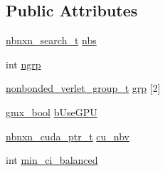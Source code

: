 \subsection*{\-Public \-Attributes}
\begin{DoxyCompactItemize}
\item 
\hyperlink{include_2types_2nbnxn__pairlist_8h_a41ece6776fdeb7f4b5f41800a871897a}{nbnxn\-\_\-search\-\_\-t} \hyperlink{structnonbonded__verlet__t_a94f84c4baa8b982529549b8024c87541}{nbs}
\item 
int \hyperlink{structnonbonded__verlet__t_aedf87f8d2c959c49f09c4f733f93ed7f}{ngrp}
\item 
\hyperlink{structnonbonded__verlet__group__t}{nonbonded\-\_\-verlet\-\_\-group\-\_\-t} \hyperlink{structnonbonded__verlet__t_ad8d7c7ac53aa27a1240899f1d6a38388}{grp} \mbox{[}2\mbox{]}
\item 
\hyperlink{include_2types_2simple_8h_a8fddad319f226e856400d190198d5151}{gmx\-\_\-bool} \hyperlink{structnonbonded__verlet__t_ac22b37aef84edf93c4c5c034873bb6a3}{b\-Use\-G\-P\-U}
\item 
\hyperlink{include_2types_2nbnxn__cuda__types__ext_8h_a472a80c4068a02a6b9fc3fa748020ae8}{nbnxn\-\_\-cuda\-\_\-ptr\-\_\-t} \hyperlink{structnonbonded__verlet__t_ad63474b3302b6a099776253ad9ac886c}{cu\-\_\-nbv}
\item 
int \hyperlink{structnonbonded__verlet__t_a8b2037416ce183ced90b462ab4414e95}{min\-\_\-ci\-\_\-balanced}
\end{DoxyCompactItemize}


